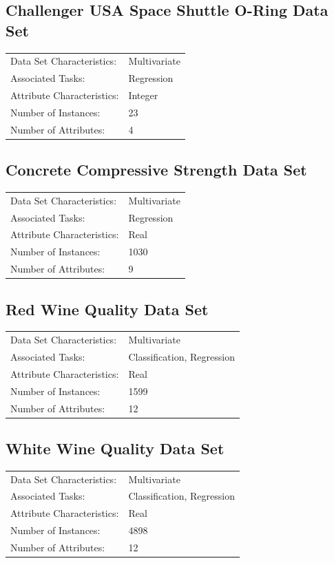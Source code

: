 \documentclass[11pt, a4paper]{report}
\begin{document}
\subsection{Challenger USA Space Shuttle O-Ring Data Set }
\begin{tabular}{l l}
	Data Set Characteristics:  & Multivariate \\
	Associated Tasks: & Regression  \\
	Attribute Characteristics: & Integer \\
	Number of Instances: & 23 \\
	Number of Attributes: & 4 \\
\end{tabular}

\subsection{Concrete Compressive Strength Data Set}
\begin{tabular}{l l}
	Data Set Characteristics:  & Multivariate \\
	Associated Tasks: & Regression  \\
	Attribute Characteristics: & Real \\
	Number of Instances: & 1030 \\
	Number of Attributes: & 9 \\
\end{tabular}

\subsection{Red Wine Quality Data Set}
\begin{tabular}{l l}
	Data Set Characteristics:  & Multivariate \\
	Associated Tasks: & Classification, Regression  \\
	Attribute Characteristics: & Real \\
	Number of Instances: & 1599 \\
	Number of Attributes: & 12 \\
\end{tabular}

\subsection{White Wine Quality Data Set}
\begin{tabular}{l l}
	Data Set Characteristics:  & Multivariate \\
	Associated Tasks: & Classification, Regression  \\
	Attribute Characteristics: & Real \\
	Number of Instances: & 4898 \\
	Number of Attributes: & 12 \\
\end{tabular}
\end{document}
